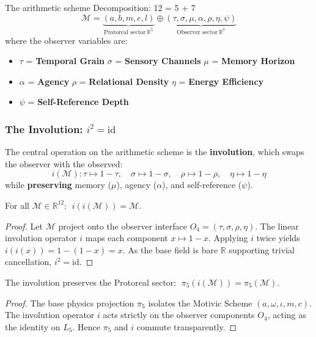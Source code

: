 \begin{arithmetic schemebox}{The arithmetic scheme Decomposition: 12 = 5 + 7}
\begin{equation}
    \mathcal{M} = \underbrace{(a, b, m, e, l)}_{\text{Protoreal sector} \ \mathbb{R}^5} \oplus \underbrace{(\tau, \sigma, \mu, \alpha, \rho, \eta, \psi)}_{\text{Observer sector} \ \mathbb{R}^7}
\end{equation}
where the observer variables are:
\begin{itemize}
    \item $\tau$ = \textbf{Temporal Grain} \quad $\sigma$ = \textbf{Sensory Channels} \quad $\mu$ = \textbf{Memory Horizon}
    \item $\alpha$ = \textbf{Agency} \quad $\rho$ = \textbf{Relational Density} \quad $\eta$ = \textbf{Energy Efficiency}
    \item $\psi$ = \textbf{Self-Reference Depth}
\end{itemize}
\end{arithmetic schemebox}

\subsubsection{The Involution: $i^2 = \mathrm{id}$}

The central operation on the arithmetic scheme is the \textbf{involution}, which swaps the observer with the observed:
\begin{equation}
    i(\mathcal{M}) : \tau \mapsto 1 - \tau, \quad \sigma \mapsto 1 - \sigma, \quad \rho \mapsto 1 - \rho, \quad \eta \mapsto 1 - \eta
\end{equation}
while \textbf{preserving} memory ($\mu$), agency ($\alpha$), and self-reference ($\psi$).

\begin{theorem}
\label{thm:involute}
For all $\mathcal{M} \in \mathbb{R}^{12}$: $\;i(i(\mathcal{M})) = \mathcal{M}$.
\end{theorem}
\begin{proof}
Let $\mathcal{M}$ project onto the observer interface $O_4 = (\tau, \sigma, \rho, \eta)$. The linear involution operator $i$ maps each component $x \mapsto 1 - x$. Applying $i$ twice yields $i(i(x)) = 1 - (1 - x) = x$. As the base field is bare $\mathbb{R}$ supporting trivial cancellation, $i^2 = \mathrm{id}$. \qedhere
\end{proof}

\begin{theorem}
The involution preserves the Protoreal sector: $\;\pi_5(i(\mathcal{M})) = \pi_5(\mathcal{M})$.
\end{theorem}
\begin{proof}
The base physics projection $\pi_5$ isolates the Motivic Scheme $(a, \omega, \iota, m, c)$. The involution operator $i$ acts strictly on the observer components $O_4$, acting as the identity on $L_5$. Hence $\pi_5$ and $i$ commute transparently. \qedhere
\end{proof}

